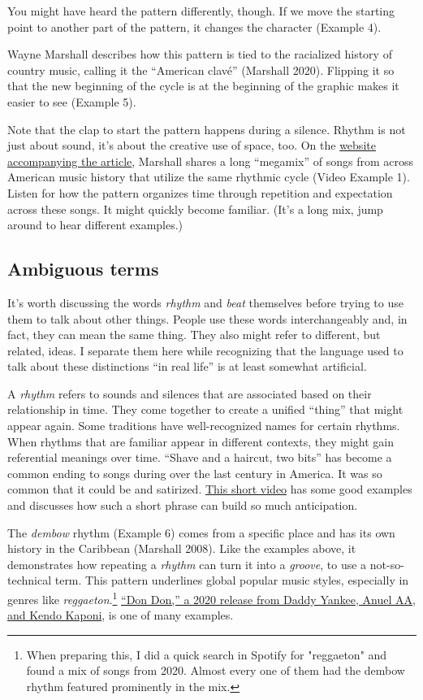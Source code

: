 \documentclass[twoside]{article}
\begin{document}
You might have heard the pattern differently, though. If we move the
starting point to another part of the pattern, it changes the character (Example 4).

Wayne Marshall describes how this pattern is tied to the racialized
history of country music, calling it the ``American clavé'' (Marshall
2020). Flipping it so that the new beginning of the cycle is at the
beginning of the graphic makes it easier to see (Example 5).

Note that the clap to start the pattern happens during a silence. Rhythm
is not just about sound, it's about the creative use of space, too. On
the \href{http://wayneandwax.com/?page_id=9315&fbclid=IwAR02xUOhjtC4fw-E6LOTQzcakI4o2IgKlkHmodg5FAbcr3X7qLmz-wS9FXk}{website accompanying the article}, Marshall shares a long ``megamix''
of songs from across American music history that utilize the same
rhythmic cycle (Video Example 1). Listen for how the pattern organizes time through
repetition and expectation across these songs. It might quickly become
familiar. (It's a long mix, jump around to hear different examples.)

\subsection*{Ambiguous terms}

It's worth discussing the words \emph{rhythm} and \emph{beat} themselves before trying
to use them to talk about other things. People use these words
interchangeably and, in fact, they can mean the same thing. They also
might refer to different, but related, ideas. I separate them here while
recognizing that the language used to talk about these distinctions ``in
real life'' is at least somewhat artificial.

A \emph{rhythm} refers to sounds and silences that are associated based on
their relationship in time. They come together to create a unified
``thing'' that might appear again. Some traditions have well-recognized
names for certain rhythms. When rhythms that are familiar appear in
different contexts, they might gain referential meanings over time.
``Shave and a haircut, two bits'' has become a common ending to songs
during over the last century in America. It was so common that it could
be and satirized. \href{https://www.youtube.com/embed/4W3cPSntmBk}{This short video} has some good examples and discusses
how such a short phrase can build so much anticipation.

The \emph{dembow} rhythm (Example 6) comes from a specific place and has its own history in
the Caribbean (Marshall 2008). Like the examples above, it demonstrates
how repeating a \emph{rhythm} can turn it into a \emph{groove}, to use a
not-so-technical term. This pattern underlines global popular music
styles, especially in genres like \emph{reggaeton}.\footnote{When preparing this, I did a quick search in Spotify for "reggaeton" and found a mix of songs from 2020. Almost every one of them had the dembow rhythm featured prominently in the mix.} \href{https://youtu.be/bZMPz5lzb2U}{``Don Don,'' a 2020 release from Daddy Yankee, Anuel AA, and Kendo Kaponi}, is one of many examples.
\end{document}
